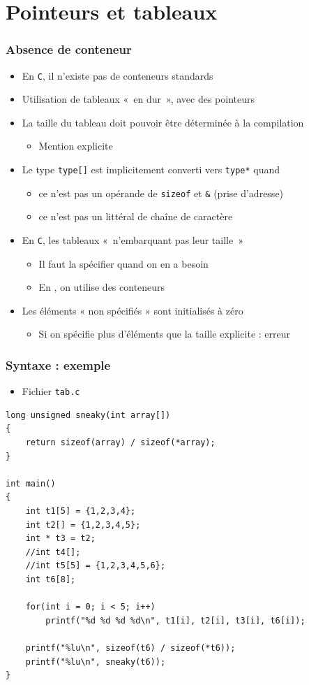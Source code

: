 \section{Pointeurs et tableaux}

\begin{frame}
\frametitle{Absence de conteneur}
\begin{itemize}[<+->]
\item En \texttt{C}, il n'existe pas de conteneurs standards	
\item Utilisation de tableaux «~en dur~», avec des pointeurs
\item La taille du tableau doit pouvoir être déterminée à la compilation
	\begin{itemize}
	\item Mention explicite
	\end{itemize}
\item Le type \texttt{type[]} est implicitement converti vers \texttt{type*} quand
	\begin{itemize}
	\item ce n'est pas un opérande de \texttt{sizeof} et \texttt{\&} (prise d'adresse)
	\item ce n'est pas un littéral de chaîne de caractère
	\end{itemize}
\item En \texttt{C}, les tableaux «~n'embarquant pas leur taille~»
	\begin{itemize}
	\item Il faut la spécifier quand on en a besoin
	\item En \cpp, on utilise des conteneurs
	\end{itemize}
\item Les éléments « non spécifiés » sont initialisés à zéro
	\begin{itemize}
	\item Si on spécifie plus d'éléments que la taille explicite : erreur
	\end{itemize}
\end{itemize}
\end{frame}

\begin{frame}[containsverbatim]
\frametitle{Syntaxe : exemple}
\begin{itemize}
\item Fichier \texttt{tab.c}
\end{itemize}
\begin{lstlisting}
long unsigned sneaky(int array[])
{
	return sizeof(array) / sizeof(*array);
}

int main()
{
	int t1[5] = {1,2,3,4};
	int t2[] = {1,2,3,4,5};
	int * t3 = t2;
	//int t4[]; 
	//int t5[5] = {1,2,3,4,5,6}; 
	int t6[8];
	
	for(int i = 0; i < 5; i++)
		printf("%d %d %d %d\n", t1[i], t2[i], t3[i], t6[i]);
		
	printf("%lu\n", sizeof(t6) / sizeof(*t6));
	printf("%lu\n", sneaky(t6));
}
\end{lstlisting}
\end{frame}

